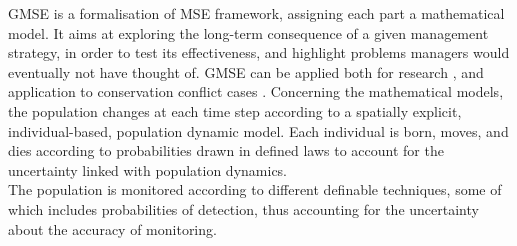 \documentclass[12pt,a4paper]{article}
\begin{document}
GMSE is a formalisation of MSE framework, assigning each part a mathematical model. %
It aims at exploring the long-term consequence of a given management strategy, in order to test its effectiveness, and highlight problems managers would eventually not have thought of.
GMSE can be applied both for research \citep{cusack2018time}, and application to conservation conflict cases \citep{bainbridge2017goose}.
Concerning the mathematical models, the population changes at each time step according to a spatially explicit, individual-based, population dynamic model.
Each individual is born, moves, and dies according to probabilities drawn in defined laws to account for the uncertainty linked with population dynamics.\\
The population is monitored according to different definable techniques, some of which includes probabilities of detection, thus accounting for the uncertainty about the accuracy of monitoring.\\ %
\end{document}

